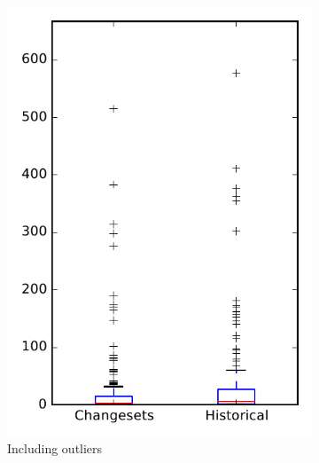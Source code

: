 
\begin{figure}
    \centering
    \begin{subfigure}{.4\textwidth}
        \centering
        \includegraphics[height=0.4\textheight]{figures/flt/rq2_bookkeeper}
        \caption{Including outliers}\label{fig:flt:rq2:bookkeeper_outlier}
    \end{subfigure}%
    \begin{subfigure}{.4\textwidth}
        \centering

\end{subfigure}
\end{figure}
